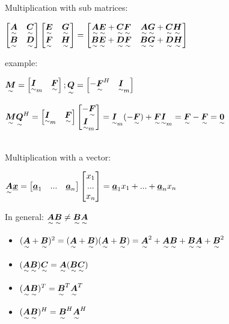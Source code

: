 Multiplication with sub matrices:

$\begin{bmatrix}\ma{A}&\ma{C}\\\ma{B}&\ma{D}\end{bmatrix}
\begin{bmatrix}\ma{E}&\ma{G}\\\ma{F}&\ma{H}\end{bmatrix}=
\begin{bmatrix}\ma{A}\ma{E}+\ma{C}\ma{F}&\ma{A}\ma{G}+\ma{C}\ma{H}\\\ma{B}\ma{E}+\ma{D}\ma{F}&\ma{B}\ma{G}+\ma{D}\ma{H}\end{bmatrix}$

example:

$\ma{M}=\begin{bmatrix}\ma{I}_m&\ma{F}\end{bmatrix}; \ma{Q}=\begin{bmatrix}-\ma{F}^H&\ma{I}_m\end{bmatrix}$

$\ma{M}\ma{Q}^H=\begin{bmatrix}\ma{I}_m&\ma{F}\end{bmatrix}\begin{bmatrix}-\ma{F}\\\ma{I}_m\end{bmatrix}
=\ma{I}_m(-\ma{F})+\ma{F}\ma{I}_m=\ma{F}-\ma{F}=\ma{0}$

\\

Multiplication with a vector:

$\ma{A}\vec{x}=\begin{bmatrix}\vec{a}_1&...&\vec{a}_n\end{bmatrix}\begin{bmatrix}x_1\\...\\x_n\end{bmatrix}
=\vec{a}_1x_1+...+\vec{a}_nx_n$

In general: $\ma{A}\ma{B}\neq\ma{B}\ma{A}$
\begin{itemize}
\item $(\ma{A}+\ma{B})^2=(\ma{A}+\ma{B})(\ma{A}+\ma{B})=\ma{A}^2+\ma{A}\ma{B}+\ma{B}\ma{A}+\ma{B}^2$
\item $(\ma{A}\ma{B})\ma{C}=\ma{A}(\ma{B}\ma{C})$
\item $(\ma{A}\ma{B})^T=\ma{B}^T\ma{A}^T$
\item $(\ma{A}\ma{B})^H=\ma{B}^H\ma{A}^H$
\end{itemize}

